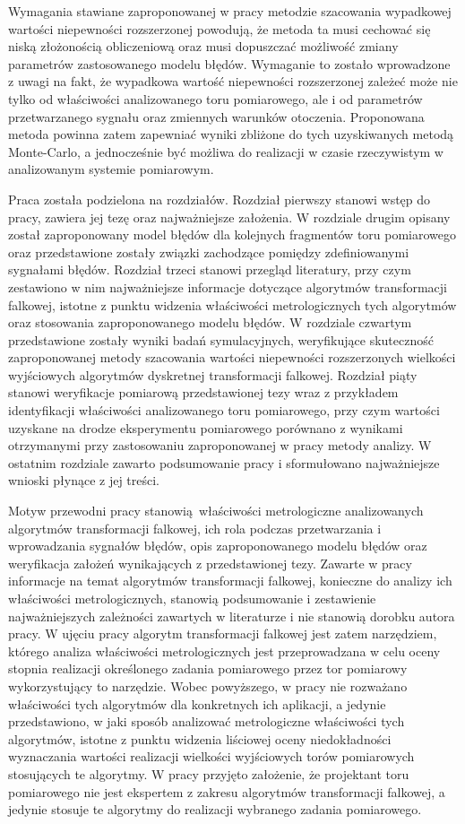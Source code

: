 Wymagania stawiane zaproponowanej w pracy metodzie szacowania wypadkowej wartości niepewności rozszerzonej powodują, że metoda ta musi cechować się niską złożonością obliczeniową oraz musi dopuszczać możliwość zmiany parametrów zastosowanego modelu błędów. Wymaganie to zostało wprowadzone z uwagi na fakt, że wypadkowa wartość niepewności rozszerzonej zależeć może nie tylko od właściwości analizowanego toru pomiarowego, ale i od parametrów przetwarzanego sygnału oraz zmiennych warunków otoczenia. Proponowana metoda powinna zatem zapewniać wyniki zbliżone do tych uzyskiwanych metodą Monte-Carlo, a jednocześnie być możliwa do realizacji w czasie rzeczywistym w analizowanym systemie pomiarowym.

Praca została podzielona na  rozdziałów. Rozdział pierwszy stanowi wstęp do pracy, zawiera jej tezę oraz najważniejsze założenia. W rozdziale drugim opisany został zaproponowany model błędów dla kolejnych fragmentów toru pomiarowego oraz przedstawione zostały związki zachodzące pomiędzy zdefiniowanymi sygnałami błędów. Rozdział trzeci stanowi przegląd literatury, przy czym zestawiono w nim najważniejsze informacje dotyczące algorytmów transformacji falkowej, istotne z punktu widzenia właściwości metrologicznych tych algorytmów oraz stosowania zaproponowanego modelu błędów. W rozdziale czwartym przedstawione zostały wyniki badań symulacyjnych, weryfikujące skuteczność zaproponowanej metody szacowania wartości niepewności rozszerzonych wielkości wyjściowych algorytmów dyskretnej transformacji falkowej. Rozdział piąty stanowi weryfikacje pomiarową przedstawionej tezy wraz z przykładem identyfikacji właściwości analizowanego toru pomiarowego, przy czym wartości uzyskane na drodze eksperymentu pomiarowego porównano z wynikami otrzymanymi przy zastosowaniu zaproponowanej w pracy metody analizy. W ostatnim rozdziale zawarto podsumowanie pracy i sformułowano najważniejsze wnioski płynące z jej treści.

Motyw przewodni pracy stanowią właściwości metrologiczne analizowanych algorytmów transformacji falkowej, ich rola podczas przetwarzania i wprowadzania sygnałów błędów, opis zaproponowanego modelu błędów oraz weryfikacja założeń wynikających z przedstawionej tezy. Zawarte w pracy informacje na temat algorytmów transformacji falkowej, konieczne do analizy ich właściwości metrologicznych, stanowią podsumowanie i zestawienie najważniejszych zależności zawartych w literaturze i nie stanowią dorobku autora pracy. W ujęciu pracy algorytm transformacji falkowej jest zatem narzędziem, którego analiza właściwości metrologicznych jest przeprowadzana w celu oceny stopnia realizacji określonego zadania pomiarowego przez tor pomiarowy wykorzystujący to narzędzie. Wobec powyższego, w pracy nie rozważano właściwości tych algorytmów dla konkretnych ich aplikacji, a jedynie przedstawiono, w jaki sposób analizować metrologiczne właściwości tych algorytmów, istotne z punktu widzenia liściowej oceny niedokładności wyznaczania wartości realizacji wielkości wyjściowych torów pomiarowych stosujących te algorytmy. W pracy przyjęto założenie, że projektant toru pomiarowego nie jest ekspertem z zakresu algorytmów transformacji falkowej, a jedynie stosuje te algorytmy do realizacji wybranego zadania pomiarowego.

